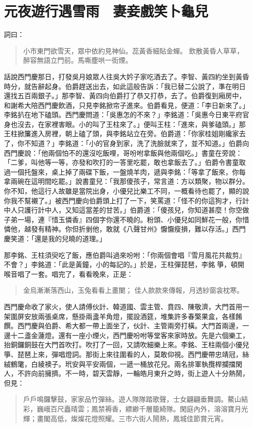 
\chapter{元夜遊行遇雪雨　妻妾戲笑卜龜兒}

詞曰：
\begin{quote}
小市東門欲雪天，眾中依約見神仙。蕊黃香細貼金蟬。
飲散黃昏人草草，醉容無語立門前。馬嘶塵哄一街煙。
\end{quote}

話說西門慶那日，打發吳月娘眾人往吳大妗子家吃酒去了。李智、黃四約坐到黃昏時分，就告辭起身。伯爵趕送出去，如此這般告訴：「我已替二公說了，準在明日還找五百兩銀子。」那李智、黃四向伯爵打了恭又打恭，去了。伯爵復到廂房中，和謝希大陪西門慶飲酒，只見李銘掀帘子進來。伯爵看見，便道：「李日新來了。」李銘扒在地下磕頭。西門慶問道：「吳惠怎的不來？」李銘道：「吳惠今日東平府官身也沒去，在家裡害眼。小的叫了王柱來了。」便叫王柱：「進來，與爹磕頭。」那王柱掀簾進入房裡，朝上磕了頭，與李銘站立在旁。伯爵道：「你家桂姐剛纔家去了，你不知道？」李銘道：「小的官身到家，洗了洗臉就來了，並不知道。」伯爵向西門慶說：「他兩個怕不的還沒吃飯哩，哥吩咐拿飯與他兩個吃。」書童在旁說：「二爹，叫他等一等，亦發和吹打的一答里吃罷，敢也拿飯去了。」伯爵令書童取過一個托盤來，桌上掉了兩碟下飯，一盤燒羊肉，遞與李銘：「等拿了飯來，你每拿兩碗在這明間吃罷。」說書童兒：「我那傻孩子，常言道：方以類聚，物以群分。你不知，他這行人故雖是當院出身，小優兒比樂工不同，一概看待也罷了，顯的說你我不幫襯了。」被西門慶向伯爵頭上打了一下，笑罵道：「怪不的你這狗才，行計中人只護行計中人，又知這當差的甘苦。」伯爵道：「傻孩兒，你知道甚麼！你空做子弟一場，連『惜玉憐香』四個字你還不曉的。粉頭、小優兒如同鮮花一般，你惜憐他，越發有精神。你但折剉他，敢就《八聲甘州》懨懨瘦損，難以存活。」西門慶笑道：「還是我的兒曉的道理。」

那李銘、王柱須臾吃了飯，應伯爵叫過來吩咐：「你兩個會唱『雪月風花共裁剪』不會？」李銘道：「此是黃鐘，小的每記的。」於是，王柱彈琵琶，李銘𢺈箏，頓開喉音唱了一套。唱完了，看看晚來，正是：
\begin{quote}
金烏漸漸落西山，玉兔看看上畫闌；
佳人款款來傳報，月透紗窗衾枕寒。
\end{quote}

西門慶命收了家火，使人請傅伙計、韓道國、雲主管、賁四、陳敬濟，大門首用一架圍屏安放兩張桌席，懸掛兩盞羊角燈，擺設酒筵，堆集許多春檠果盒，各樣餚饌。西門慶與伯爵、希大都一帶上面坐了，伙計、主管兩旁打橫。大門首兩邊，一邊十二盞金蓮燈。還有一座小煙火，西門慶吩咐等堂客來家時放。先是六個樂工，抬銅鑼銅鼓在大門首吹打。吹打了一回，又請吹細樂上來。李銘、王柱兩個小優兒箏、琵琶上來，彈唱燈詞。那街上來往圍看的人，莫敢仰視。西門慶帶忠靖冠，絲絨鶴氅，白綾襖子。玳安與平安兩個，一遞一桶放花兒。兩名排軍執攬桿攔擋閑人，不許向前擁擠。不一時，碧天雲靜，一輪皓月東升之時，街上遊人十分熱鬧，但見：
\begin{quote}
戶戶鳴鑼擊鼓，家家品竹彈絲。遊人隊隊踏歌聲，士女翩翩垂舞調。鰲山結彩，巍峨百尺矗晴雲；鳳禁褥香，縹緲千層籠綺隊。閑庭內外，溶溶寶月光輝；畫閣高低，燦燦花燈照耀。三市六街人鬧熱，鳳城佳節賞元宵。
\end{quote}


